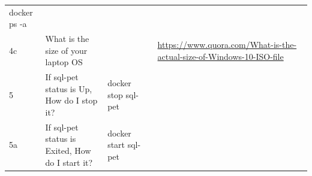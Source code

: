 \documentclass[]{book}
\theoremstyle{definition}
\theoremstyle{definition}
\theoremstyle{definition}
\theoremstyle{remark}
\begin{document}
\begin{longtable}[]{@{}lllll@{}}
\begin{minipage}[t]{0.29\columnwidth}
docker ps -a\strut
\end{minipage} & \begin{minipage}[t]{0.20\columnwidth}\raggedright
\strut
\end{minipage} & \begin{minipage}[t]{0.16\columnwidth}\raggedright
\strut
\end{minipage}\tabularnewline
\begin{minipage}[t]{0.02\columnwidth}\raggedright
4c\strut
\end{minipage} & \begin{minipage}[t]{0.19\columnwidth}\raggedright
What is the size of your laptop OS\strut
\end{minipage} & \begin{minipage}[t]{0.29\columnwidth}\raggedright
\strut
\end{minipage} & \begin{minipage}[t]{0.20\columnwidth}\raggedright
\strut
\end{minipage} & \begin{minipage}[t]{0.16\columnwidth}\raggedright
\url{https://www.quora.com/What-is-the-actual-size-of-Windows-10-ISO-file}\strut
\end{minipage}\tabularnewline
\begin{minipage}[t]{0.02\columnwidth}\raggedright
5\strut
\end{minipage} & \begin{minipage}[t]{0.19\columnwidth}\raggedright
If sql-pet status is Up, How do I stop it?\strut
\end{minipage} & \begin{minipage}[t]{0.29\columnwidth}\raggedright
docker stop sql-pet\strut
\end{minipage} & \begin{minipage}[t]{0.20\columnwidth}\raggedright
\strut
\end{minipage} & \begin{minipage}[t]{0.16\columnwidth}\raggedright
\strut
\end{minipage}\tabularnewline
\begin{minipage}[t]{0.02\columnwidth}\raggedright
5a\strut
\end{minipage} & \begin{minipage}[t]{0.19\columnwidth}\raggedright
If sql-pet status is Exited, How do I start it?\strut
\end{minipage} & \begin{minipage}[t]{0.29\columnwidth}\raggedright
docker start sql-pet\strut
\end{minipage} & \begin{minipage}[t]{0.20\columnwidth}\raggedright
\strut
\end{minipage} & \begin{minipage}[t]{0.16\columnwidth}\raggedright
\strut
\end{minipage}\tabularnewline
\bottomrule
\end{longtable}
\end{document}
